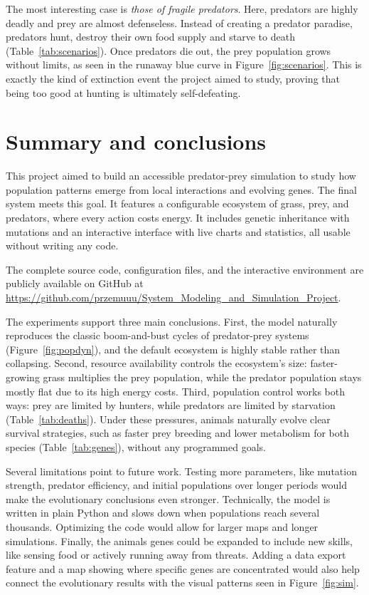 \documentclass[english]{projectreport}
\begin{document}
The most interesting case is \emph{those of fragile predators}. Here, predators are highly deadly and prey are almost defenseless. Instead of creating a predator paradise, predators hunt, destroy their own food supply and starve to death (Table~\ref{tab:scenarios}). Once predators die out, the prey population grows without limits, as seen in the runaway blue curve in Figure~\ref{fig:scenarios}. This is exactly the kind of extinction event the project aimed to study, proving that being too good at hunting is ultimately self-defeating.

\section{Summary and conclusions}
\label{sec:summary}

This project aimed to build an accessible predator-prey simulation to study how population patterns emerge from local interactions and evolving genes. The final system meets this goal. It features a configurable ecosystem of grass, prey, and predators, where every action costs energy. It includes genetic inheritance with mutations and an interactive interface with live charts and statistics, all usable without writing any code.

The complete source code, configuration files, and the interactive environment are publicly available on GitHub at \url{https://github.com/przemuuu/System_Modeling_and_Simulation_Project}.

The experiments support three main conclusions. First, the model naturally reproduces the classic boom-and-bust cycles of predator-prey systems (Figure~\ref{fig:popdyn}), and the default ecosystem is highly stable rather than collapsing. Second, resource availability controls the ecosystem's size: faster-growing grass multiplies the prey population, while the predator population stays mostly flat due to its high energy costs. Third, population control works both ways: prey are limited by hunters, while predators are limited by starvation (Table~\ref{tab:deaths}). Under these pressures, animals naturally evolve clear survival strategies, such as faster prey breeding and lower metabolism for both species (Table~\ref{tab:genes}), without any programmed goals.

Several limitations point to future work. Testing more parameters, like mutation strength, predator efficiency, and initial populations over longer periods would make the evolutionary conclusions even stronger. Technically, the model is written in plain Python and slows down when populations reach several thousands. Optimizing the code would allow for larger maps and longer simulations. Finally, the animals genes could be expanded to include new skills, like sensing food or actively running away from threats. Adding a data export feature and a map showing where specific genes are concentrated would also help connect the evolutionary results with the visual patterns seen in Figure~\ref{fig:sim}.

\printbibliography

\end{document}
